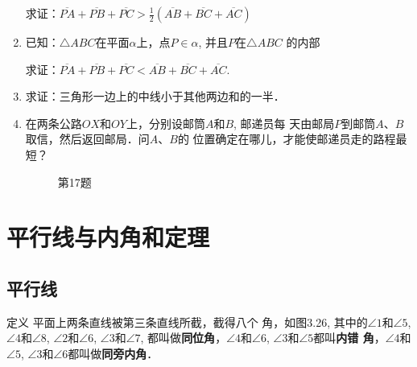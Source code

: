 \begin{enumerate}
求证：$\overline{PA}+\overline{PB}+\overline{PC}>\frac{1}{2}(\overline{AB}+\overline{BC}+\overline{AC})$
\item 已知：$\triangle ABC$在平面$\alpha$上，点$P\in\alpha$, 并且$P$在$\triangle ABC$
的内部

求证：$\overline{PA}+\overline{PB}+\overline{PC}<\overline{AB}+\overline{BC}+\overline{AC}$.
\item 求证：三角形一边上的中线小于其他两边和的一半．
\item 在两条公路$OX$和$OY$上，分别设邮筒$A$和$B$, 邮递员每
天由邮局$P$到邮筒$A$、$B$取信，然后返回邮局．问$A$、$B$的
位置确定在哪儿，才能使邮递员走的路程最短？

\begin{figure}[htbp]
    \centering
{}
    \caption*{第17题}
\end{figure}
\end{enumerate}

\section{平行线与内角和定理}

\subsection{平行线}
\begin{blk}
    {定义}
平面上两条直线被第三条直线所截，截得八个
角，如图3.26, 其中的$\angle 1$和$\angle 5$, $\angle 4$和$\angle 8$, $\angle 2$和$\angle 6$, 
$\angle 3$和$\angle 7$, 都叫做\textbf{同位角}，$\angle 4$和$\angle 6$, $\angle 3$和$\angle 5$都叫\textbf{内错
角}，$\angle 4$和$\angle 5$, $\angle 3$和$\angle 6$都叫做\textbf{同旁内角}．
\end{blk}

